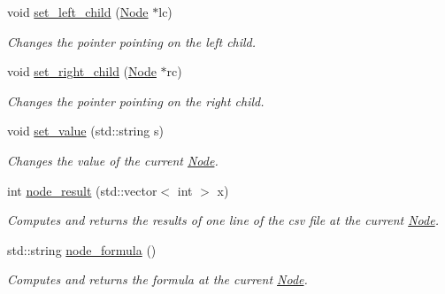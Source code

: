\begin{DoxyCompactItemize}
void \hyperlink{classNode_a50c34dde7898f3992c72eef3df00917b}{set\+\_\+left\+\_\+child} (\hyperlink{classNode}{Node} $\ast$lc)
\begin{DoxyCompactList}\small\item\em Changes the pointer pointing on the left child. \end{DoxyCompactList}\item 
\mbox{\label{classNode_a85f67c5236d38be3e552551b408c2399}} 
void \hyperlink{classNode_a85f67c5236d38be3e552551b408c2399}{set\+\_\+right\+\_\+child} (\hyperlink{classNode}{Node} $\ast$rc)
\begin{DoxyCompactList}\small\item\em Changes the pointer pointing on the right child. \end{DoxyCompactList}\item 
\mbox{\label{classNode_af93bfefb945b9cf6acf3ad1361c4810f}} 
void \hyperlink{classNode_af93bfefb945b9cf6acf3ad1361c4810f}{set\+\_\+value} (std\+::string s)
\begin{DoxyCompactList}\small\item\em Changes the value of the current \hyperlink{classNode}{Node}. \end{DoxyCompactList}\item 
\mbox{\label{classNode_adf58a08bb7b8f8247b5a7db7339e6385}} 
int \hyperlink{classNode_adf58a08bb7b8f8247b5a7db7339e6385}{node\+\_\+result} (std\+::vector$<$ int $>$ x)
\begin{DoxyCompactList}\small\item\em Computes and returns the results of one line of the csv file at the current \hyperlink{classNode}{Node}. \end{DoxyCompactList}\item 
\mbox{\label{classNode_ac7dee6a30adfb99120189f280e61bc4b}} 
std\+::string \hyperlink{classNode_ac7dee6a30adfb99120189f280e61bc4b}{node\+\_\+formula} ()
\begin{DoxyCompactList}\small\item\em Computes and returns the formula at the current \hyperlink{classNode}{Node}. \end{DoxyCompactList}\end{DoxyCompactItemize}
